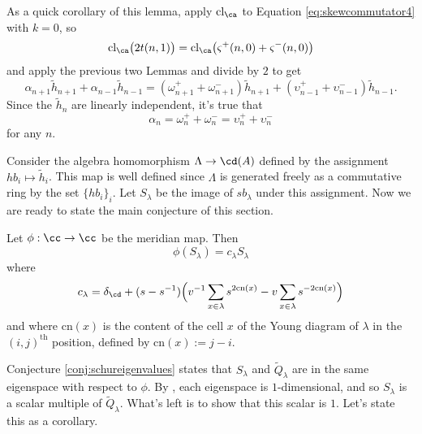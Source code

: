 \begin{remark}
As a quick corollary of this lemma, apply $\textrm{cl}_\ca$ to Equation \eqref{eq:skewcommutator4} with $k=0$, so
\[
\textrm{cl}_\ca \big( 2 t(n, 1) \big) = \textrm{cl}_\ca \big( \varsigma^+ (n, 0) + \varsigma^- (n, 0) \big)
\]
and apply the previous two Lemmas and divide by $2$ to get
\[
\alpha_{n+1} \tilde{h}_{n+1} + \alpha_{n-1} \tilde{h}_{n-1} = (\omega^+_{n+1} + \omega^-_{n+1}) \tilde{h}_{n+1} + (\upsilon^+_{n-1} + \upsilon^-_{n-1}) \tilde{h}_{n-1}.
\]
Since the $\tilde{h}_n$ are linearly independent, it's true that 
\begin{equation}
\alpha_n = \omega_n^+ + \omega_n^- = \upsilon_n^+ + \upsilon_n^-
\end{equation}
for any $n$. 
\end{remark}

Consider the algebra homomorphism $\Lambda \to \cd(A)$ defined by the assignment $hb_i \mapsto \tilde{h}_i$. This map is well defined since $\Lambda$ is generated freely as a commutative ring by the set $\{hb_i\}_{i}$. Let $S_\lambda$ be the image of $sb_\lambda$ under this assignment. Now we are ready to state the main conjecture of this section.

\begin{conjecture} \label{conj:schureigenvalues}
Let $\phi: \cc \to \cc$ be the meridian map.  Then
\begin{equation}
\phi ( S_\lambda ) = c_\lambda S_\lambda
\end{equation}
where
\begin{equation}
c_\lambda = \delta_\cd + ( s - s^{-1} ) \Big( v^{-1} \sum_{x \in \lambda} s^{2 \textrm{cn}(x)} - v \sum_{x \in \lambda} s^{-2 \textrm{cn}(x)} \Big)
\end{equation}
and where $\textrm{cn}(x)$ is the content of the cell $x$ of the Young diagram of $\lambda$ in the $(i,j)^{\textrm{th}}$ position, defined by $\textrm{cn}(x) := j-i$.
\end{conjecture}

Conjecture \ref{conj:schureigenvalues} states that $S_\lambda$ and $\widetilde{Q}_\lambda$ are in the same eigenspace with respect to $\phi$. By \cite{LZ02}, each eigenspace is $1$-dimensional, and so $S_\lambda$ is a scalar multiple of $\widetilde{Q}_\lambda$. What's left is to show that this scalar is $1$. Let's state this as a corollary.

